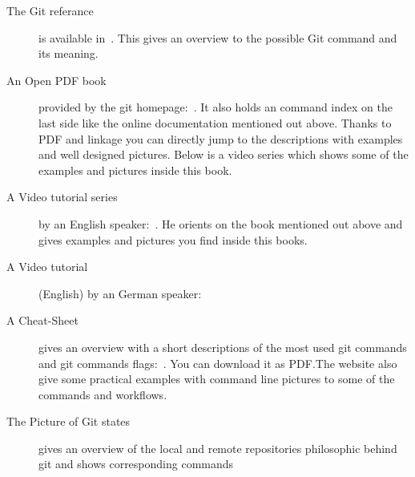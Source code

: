 \begin{description}
    \item[The Git referance] is available in~\cite{gitdoc}. This gives
        an overview to the possible Git command and its meaning.
    \item[An Open PDF book] provided by the git homepage:~\cite{Chacon2014}. It
        also holds an command index on the last side like the online
        documentation mentioned out above. Thanks to PDF and linkage you
        can directly jump to the descriptions with examples and well designed
        pictures. Below is a video series which shows some of the examples and
        pictures inside this book.
    \item[A Video tutorial series] by an English
        speaker:~\cite{gitvideotutorial_en}.
        He orients on the book mentioned out above and gives examples and
        pictures you find inside this books.
    \item[A Video tutorial] (English) by an German
        speaker:~\cite{gitvideotutorial_de_en}
    \item[A Cheat-Sheet] gives an overview with a short descriptions of the most
        used git commands and git commands flags:~\cite{git_cheat_sheet}. You
        can download it as PDF.\@ The website also give some practical examples
        with command line pictures to some of the commands and workflows.
    \item[The Picture of Git states] gives an overview of the local and remote
        repositories philosophic behind git and shows corresponding
        commands~\cite{git_picture}
\end{description}


